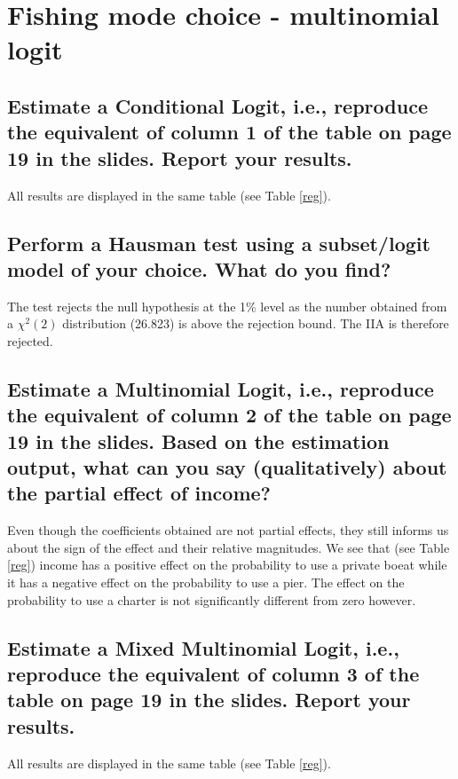 \documentclass[12pt]{article}
\begin{document}
\section{Fishing mode choice - multinomial logit}
\subsection{Estimate a Conditional Logit, i.e., reproduce the equivalent of column 1 of the table on page 19 in the slides. Report your results.}
All results are displayed in the same table (see Table \ref{reg}).
\subsection{Perform a Hausman test using a subset/logit model of your choice. What do you find?}
The test rejects the null hypothesis at the 1\% level as the number obtained from a $\chi^2(2)$ distribution (26.823) is above the rejection bound. The IIA is therefore rejected.
\subsection{Estimate a Multinomial Logit, i.e., reproduce the equivalent of column 2 of the table on page 19 in the slides. Based on the estimation output, what can you say (qualitatively) about the partial effect of income?}
Even though the coefficients obtained are not partial effects, they still informs us about the sign of the effect and their relative magnitudes. We see that (see Table \ref{reg}) income has a positive effect on the probability to use a private boeat while it has a negative effect on the probability to use a pier. The effect on the probability to use a charter is not significantly different from zero however.
\subsection{Estimate a Mixed Multinomial Logit, i.e., reproduce the equivalent of column 3 of the table on page 19 in the slides. Report your results.}
All results are displayed in the same table (see Table \ref{reg}).

\end{document}
